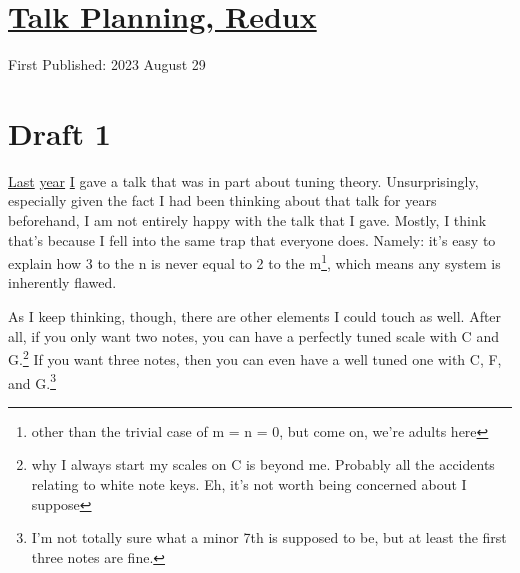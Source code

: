 \documentclass[12pt]{article}[titlepage]
\newcommand{\1}{\={a}}
\newcommand{\2}{\={e}}
\newcommand{\3}{\={\i}}
\newcommand{\4}{\=o}
\newcommand{\5}{\=u}
\newcommand{\6}{\={A}}
\renewcommand{\,}{\textsuperscript{,}}
\begin{document}
\doublespacing
\section{\href{talk-planning-redux-1.html}{Talk Planning, Redux}}
First Published: 2023 August 29
\section{Draft 1}
\href{talk-planning-1}{Last} \href{talk-planning-2}{year} \href{talk-planning-3}{I} gave a talk that was in part about tuning theory.
Unsurprisingly, especially given the fact I had been thinking about that talk for years beforehand, I am not entirely happy with the talk that I gave.
Mostly, I think that's because I fell into the same trap that everyone does.
Namely: it's easy to explain how 3 to the n is never equal to 2 to the m\footnote{other than the trivial case of m = n = 0, but come on, we're adults here}, which means any system is inherently flawed.

As I keep thinking, though, there are other elements I could touch as well.
After all, if you only want two notes, you can have a perfectly tuned scale with C and G.\footnote{why I always start my scales on C is beyond me.
Probably all the accidents relating to white note keys.
Eh, it's not worth being concerned about I suppose}
If you want three notes, then you can even have a well tuned one with C, F, and G.\footnote{I'm not totally sure what a minor 7th is supposed to be, but at least the first three notes are fine.}
\end{document}

